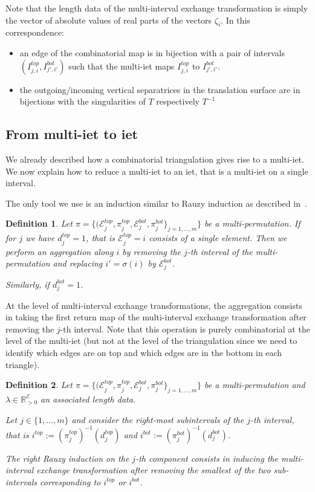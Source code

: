 \documentclass{article}
\def\RR{\mathbb{R}}
\def\cE{\mathcal{E}}
\newtheorem{definition}{Definition}
\begin{document}
Note that the length data of the multi-interval exchange transformation is
simply the vector of absolute values of real parts of the vectors $\zeta_i$.
In this correspondence:
\begin{itemize}
\item an edge of the combinatorial map is in bijection with a pair of intervals
$(I^{top}_{j,i}, I^{bot}_{j',i'})$ such that the multi-iet maps $I^{top}_{j,i}$
to $I^{bot}_{j',i'}$.
\item the outgoing/incoming vertical separatrices in the translation surface are
in bijections with the singularities of $T$ respectively $T^{-1}$
\end{itemize}

\subsection{From multi-iet to iet}
We already described how a combinatorial triangulation gives rise to a
multi-iet. We now explain how to reduce a multi-iet to an iet, that is
a multi-iet on a single interval.

The only tool we use is an induction similar to Rauzy induction
as described in~\cite{Yoccoz}.
\begin{definition}
Let
$\pi = \{(\cE^{top}_j, \pi^{top}_j, \cE^{bot}_j, \pi^{bot}_j\}_{j=1,\ldots,m}\}$
be a multi-permutation.
If for $j$ we have $d_j^{top} = 1$, that is $\cE^{top}_j = {i}$ consists of a single
element. Then we perform an \emph{aggregation along $i$} by removing the
$j$-th interval of the multi-permutation and replacing
$i' = \sigma(i)$ by $\cE^{bot}_j$.

Similarly, if $d_j^{bot} = 1$.
\end{definition}
At the level of multi-interval exchange transformations, the aggregation
consists in taking the first return map of the multi-interval
exchange transformation after removing the $j$-th interval. Note that this
operation is purely combinatorial at the level of the multi-iet (but not
at the level of the triangulation since we need to identify which edges
are on top and which edges are in the bottom in each triangle).

\begin{definition}
Let
$\pi = \{(\cE^{top}_j, \pi^{top}_j, \cE^{bot}_j, \pi^{bot}_j\}_{j=1,\ldots,m}\}$
be a multi-permutation and $\lambda \in \RR_{>0}^{\cE}$ an associated
length data.

Let $j \in \{1,\ldots,m\}$ and consider the right-most subintervals of
the $j$-th interval, that is $i^{top} := (\pi^{top}_j)^{-1}(d_j^{top})$
and $i^{bot} := (\pi^{bot}_j)^{-1}(d_j^{bot})$.

The \emph{right Rauzy induction on the $j$-th component} consists in inducing
the multi-interval exchange transformation after removing the smallest of
the two sub-intervals corresponding to $i^{top}$ or $i^{bot}$.
\end{definition}
\end{document}
